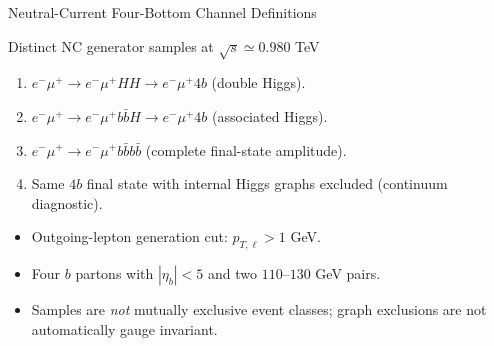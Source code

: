 \documentclass[aspectratio=1610,english]{beamer}
\newcommand{\src}[1]{\vfill{\par\color{black!65}\fontsize{6.4}{7.4}\selectfont\emph{Source:} #1\par}}
\begin{document}
\begin{frame}[t]{Neutral-Current Four-Bottom Channel Definitions}
\small

\begin{block}{Distinct NC generator samples at $\sqrt{s}\simeq0.980$ TeV}
\begin{enumerate}
\item $e^-\mu^+\to e^-\mu^+HH\to e^-\mu^+4b$ (double Higgs).
\item $e^-\mu^+\to e^-\mu^+b\bar b H\to e^-\mu^+4b$ (associated Higgs).
\item $e^-\mu^+\to e^-\mu^+b\bar b b\bar b$ (complete final-state amplitude).
\item Same $4b$ final state with internal Higgs graphs excluded (continuum diagnostic).
\end{enumerate}
\end{block}
\begin{itemize}
\item Outgoing-lepton generation cut: $p_{T,\ell}>1$ GeV.
\item Four $b$ partons with $|\eta_b|<5$ and two $110$--$130$ GeV pairs.
\item Samples are \emph{not} mutually exclusive event classes; graph exclusions are not automatically gauge invariant.
\end{itemize}

\end{frame}
\end{document}
